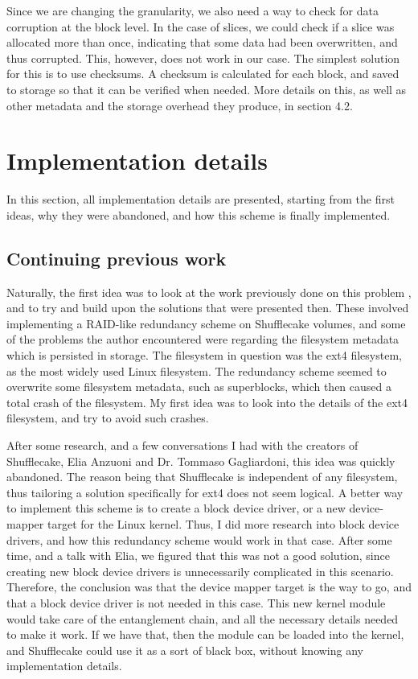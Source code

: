 \documentclass[a4paper,11pt,oneside]{report}
\begin{document}
Since we are changing the granularity, we also need a way to check for data corruption at the block level. In the case of slices, we could check if a slice was allocated more than once, indicating that some data had been overwritten, and thus corrupted. This, however, does not work in our case. The simplest solution for this is to use checksums. A checksum is calculated for each block, and saved to storage so that it can be verified when needed. More details on this, as well as other metadata and the storage overhead they produce, in section 4.2. 

\chapter{Implementation details}
In this section, all implementation details are presented, starting from the first ideas, why they were abandoned, and how this scheme is finally implemented.

\section{Continuing previous work}
Naturally, the first idea was to look at the work previously done on this problem \cite{kilian}, and to try and build upon the solutions that were presented then. These involved implementing a RAID-like redundancy scheme on Shufflecake volumes, and some of the problems the author encountered were regarding the filesystem metadata which is persisted in storage. The filesystem in question was the ext4 filesystem, as the most widely used Linux filesystem. The redundancy scheme seemed to overwrite some filesystem metadata, such as superblocks, which then caused a total crash of the filesystem. My first idea was to look into the details of the ext4 filesystem, and try to avoid such crashes. 

After some research, and a few conversations I had with the creators of Shufflecake, Elia Anzuoni and Dr. Tommaso Gagliardoni, this idea was quickly abandoned. The reason being that Shufflecake is independent of any filesystem, thus tailoring a solution specifically for ext4 does not seem logical. A better way to implement this scheme is to create a block device driver, or a new device-mapper target for the Linux kernel. Thus, I did more research into block device drivers, and how this redundancy scheme would work in that case. After some time, and a talk with Elia, we figured that this was not a good solution, since creating new block device drivers is unnecessarily complicated in this scenario. Therefore, the conclusion was that the device mapper target is the way to go, and that a block device driver is not needed in this case. This new kernel module would take care of the entanglement chain, and all the necessary details needed to make it work. If we have that, then the module can be loaded into the kernel, and Shufflecake could use it as a sort of black box, without knowing any implementation details. 
\end{document}
